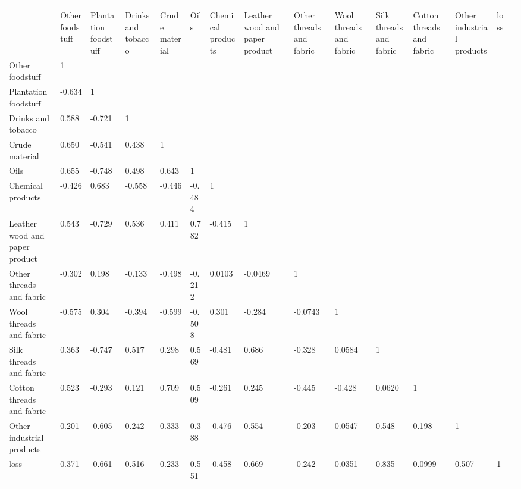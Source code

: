 \begin{tabular}{p{2.3cm} p{1.5cm} p{1.5cm} p{1.5cm} p{2.3cm} p{1.5cm} p{1.5cm} p{1.5cm} p{2.3cm} p{1.5cm} p{1.5cm} p{1.5cm} p{2.3cm} p{2.3cm} p{2.3cm}}
                &\multicolumn{13}{c}{}                                                                                                            \\
                &Other foodstuff&Plantation foodstuff&Drinks and tobacco&Crude material&     Oils&Chemical products&Leather wood and paper product&Other threads and fabric&Wool threads and fabric&Silk threads and fabric&Cotton threads and fabric&Other industrial products&     loss\\
\hline
Other foodstuff &        1&         &         &         &         &         &         &         &         &         &         &         &         \\
Plantation foodstuff&   -0.634&        1&         &         &         &         &         &         &         &         &         &         &         \\
Drinks and tobacco&    0.588&   -0.721&        1&         &         &         &         &         &         &         &         &         &         \\
Crude material  &    0.650&   -0.541&    0.438&        1&         &         &         &         &         &         &         &         &         \\
Oils            &    0.655&   -0.748&    0.498&    0.643&        1&         &         &         &         &         &         &         &         \\
Chemical products&   -0.426&    0.683&   -0.558&   -0.446&   -0.484&        1&         &         &         &         &         &         &         \\
Leather wood and paper product&    0.543&   -0.729&    0.536&    0.411&    0.782&   -0.415&        1&         &         &         &         &         &         \\
Other threads and fabric&   -0.302&    0.198&   -0.133&   -0.498&   -0.212&   0.0103&  -0.0469&        1&         &         &         &         &         \\
Wool threads and fabric&   -0.575&    0.304&   -0.394&   -0.599&   -0.508&    0.301&   -0.284&  -0.0743&        1&         &         &         &         \\
Silk threads and fabric&    0.363&   -0.747&    0.517&    0.298&    0.569&   -0.481&    0.686&   -0.328&   0.0584&        1&         &         &         \\
Cotton threads and fabric&    0.523&   -0.293&    0.121&    0.709&    0.509&   -0.261&    0.245&   -0.445&   -0.428&   0.0620&        1&         &         \\
Other industrial products&    0.201&   -0.605&    0.242&    0.333&    0.388&   -0.476&    0.554&   -0.203&   0.0547&    0.548&    0.198&        1&         \\
loss            &    0.371&   -0.661&    0.516&    0.233&    0.551&   -0.458&    0.669&   -0.242&   0.0351&    0.835&   0.0999&    0.507&        1\\
\end{tabular}
